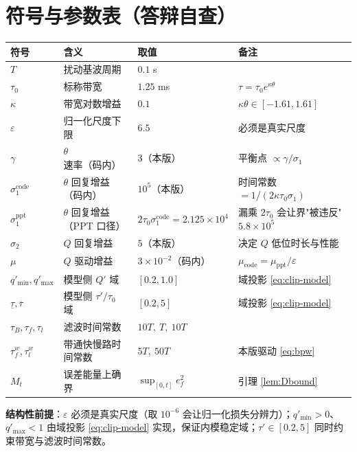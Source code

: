 \documentclass[11pt]{article}
\theoremstyle{remark}\newtheorem{remark}{注}
\newcommand{\ef}{e_f}
\newcommand{\taub}{\tau_B}
\newcommand{\tauf}{\tau_f}
\newcommand{\taul}{\tau_l}
\newcommand{\sone}{\sigma_1^{\mathrm{ppt}}}
\begin{document}
\section{符号与参数表（答辩自查）}\label{sec:sym}
\begin{center}
\small
\begin{tabular}{@{}llll@{}}
\toprule
符号 & 含义 & 取值 & 备注\\
\midrule
$T$ & 扰动基波周期 & $0.1$ s & \\
$\tau_0$ & 标称带宽 & $1.25$ ms & $\tau=\tau_0e^{\kappa\theta}$\\
$\kappa$ & 带宽对数增益 & $0.1$ & $\kappa\theta\in[-1.61,1.61]$\\
$\varepsilon$ & 归一化尺度下限 & $6.5$ & 必须是真实尺度\\
$\gamma$ & $\theta$ 速率（码内） & $3$（本版） & 平衡点 $\propto\gamma/\sigma_1$\\

$\sigma_1^{\mathrm{code}}$ & $\theta$ 回复增益（码内） & $10^{5}$（本版） & 时间常数 $=1/(2\kappa\tau_0\sigma_1)$\\
$\sone$ & $\theta$ 回复增益（PPT 口径） & $2\tau_0\sigma_1^{\mathrm{code}}=2.125\times10^{4}$ & 漏乘 $2\tau_0$ 会让界"被违反" $5.8\times10^{5}$\\
$\sigma_2$ & $Q$ 回复增益 & $5$（本版） & 决定 $Q$ 低位时长与性能\\
$\mu$ & $Q$ 驱动增益 & $3\times10^{-2}$（码内） & $\mu_{\mathrm{code}}=\mu_{\mathrm{ppt}}/\varepsilon$\\
$q'_{\min},q'_{\max}$ & 模型侧 $Q'$ 域 & $[0.2,1.0]$ & 域投影 \eqref{eq:clip-model}\\
$\underline\tau,\overline\tau$ & 模型侧 $\tau'/\tau_0$ 域 & $[0.2,5]$ & 域投影 \eqref{eq:clip-model}\\
$\taub,\tauf,\taul$ & 滤波时间常数 & $10T,\ T,\ 10T$ & \\
$\tau_f^w,\tau_l^w$ & 带通快慢路时间常数 & $5T,\ 50T$ & 本版驱动 \eqref{eq:bpw}\\





$M_t$ & 误差能量上确界 & $\sup_{[0,t]}\ef^2$ & 引理 \ref{lem:Dbound}\\

\bottomrule
\end{tabular}
\end{center}
\noindent\textbf{结构性前提}：$\varepsilon$ 必须是真实尺度（取 $10^{-6}$ 会让归一化损失分辨力）；$q'_{\min}>0$、$q'_{\max}<1$ 由域投影 \eqref{eq:clip-model} 实现，保证内模稳定域；$\tau'\in[0.2,5]$ 同时约束带宽与滤波时间常数。
\end{document}
